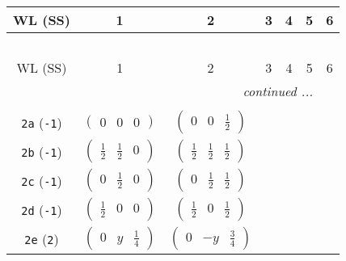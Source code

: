 \documentclass[fleqn,9pt,landscape]{jsarticle}
\begin{document}
\begin{center}
\renewcommand{\arraystretch}{1.2}
\begin{longtable}{ccccccc}
 \hline \hline
WL (SS) & 1 & 2 & 3 & 4 & 5 & 6 \\ \hline \endfirsthead

\multicolumn{6}{l}{\tablename\ \thetable{}} \\
 \hline \hline
WL (SS) & 1 & 2 & 3 & 4 & 5 & 6 \\ \hline \endhead

 \hline \hline
\multicolumn{6}{r}{\footnotesize\it continued ...} \\ \endfoot

 \hline \hline
\multicolumn{6}{r}{} \\ \endlastfoot

{\tt 2a} ({\tt -1}) & $ \begin{pmatrix} 0 & 0 & 0 \end{pmatrix} $ & $ \begin{pmatrix} 0 & 0 & \frac{1}{2} \end{pmatrix} $ & $  $ & $  $ \\ \hline
{\tt 2b} ({\tt -1}) & $ \begin{pmatrix} \frac{1}{2} & \frac{1}{2} & 0 \end{pmatrix} $ & $ \begin{pmatrix} \frac{1}{2} & \frac{1}{2} & \frac{1}{2} \end{pmatrix} $ & $  $ & $  $ \\ \hline
{\tt 2c} ({\tt -1}) & $ \begin{pmatrix} 0 & \frac{1}{2} & 0 \end{pmatrix} $ & $ \begin{pmatrix} 0 & \frac{1}{2} & \frac{1}{2} \end{pmatrix} $ & $  $ & $  $ \\ \hline
{\tt 2d} ({\tt -1}) & $ \begin{pmatrix} \frac{1}{2} & 0 & 0 \end{pmatrix} $ & $ \begin{pmatrix} \frac{1}{2} & 0 & \frac{1}{2} \end{pmatrix} $ & $  $ & $  $ \\ \hline
{\tt 2e} ({\tt 2}) & $ \begin{pmatrix} 0 & y & \frac{1}{4} \end{pmatrix} $ & $ \begin{pmatrix} 0 & - y & \frac{3}{4} \end{pmatrix} $ & $  $ & $  $ \\ \hline

\end{longtable}
\end{center}
\end{document}
